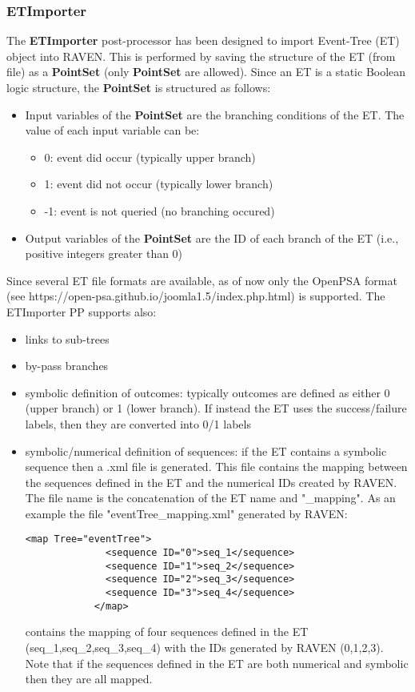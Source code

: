 
\subsubsection{ETImporter}
\label{ETImporterPP}
The \textbf{ETImporter} post-processor has been designed to import Event-Tree (ET) object into
RAVEN. This is performed by saving the structure of the ET (from file) as a \textbf{PointSet} (only \textbf{PointSet} are allowed).
Since an ET is a static Boolean logic structure, the \textbf{PointSet} is structured as follows:
\begin{itemize}
  \item Input variables of the \textbf{PointSet} are the branching conditions of the ET. The value of each input variable can be:
  \begin{itemize}
    \item  0: event did occur (typically upper branch)
    \item  1: event did not occur (typically lower branch)
    \item -1: event is not queried (no branching occured)
  \end{itemize}
  \item Output variables of the \textbf{PointSet} are the ID of each branch of the ET (i.e., positive integers greater than 0)
\end{itemize}
Since several ET file formats are available, as of now only the OpenPSA format (see https://open-psa.github.io/joomla1.5/index.php.html) is supported.
The ETImporter PP supports also:
\begin{itemize}
  \item links to sub-trees
  \item by-pass branches
  \item symbolic definition of outcomes: typically outcomes are defined as either 0 (upper branch) or 1 (lower branch). If instead the ET uses the
        success/failure labels, then they are converted into 0/1 labels
  \item symbolic/numerical definition of sequences: if the ET contains a symbolic sequence then a .xml file is generated.  This file contains
        the mapping between the sequences defined in the ET and the numerical IDs created by RAVEN. The file name is the concatenation of the ET name
        and "\_mapping". As an example the file "eventTree\_mapping.xml" generated by RAVEN:
        \begin{lstlisting}[style=XML]
            <map Tree="eventTree">
              <sequence ID="0">seq_1</sequence>
              <sequence ID="1">seq_2</sequence>
              <sequence ID="2">seq_3</sequence>
              <sequence ID="3">seq_4</sequence>
            </map>
        \end{lstlisting}
        contains the mapping of four sequences defined in the ET (seq\_1,seq\_2,seq\_3,seq\_4) with the IDs generated by RAVEN (0,1,2,3).
        Note that if the sequences defined in the ET are both numerical and symbolic then they are all mapped.
\end{itemize}
